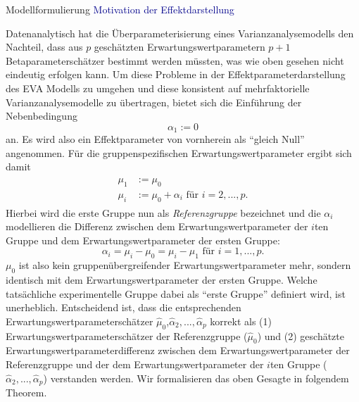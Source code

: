 \documentclass[
  8pt,
  ignorenonframetext,
]{beamer}
\begin{document}
\begin{frame}{Modellformulierung}
\protect\hypertarget{modellformulierung-2}{}
\textcolor{darkblue}{Motivation der Effektdarstellung}

\footnotesize

Datenanalytisch hat die Überparameterisierung eines
Varianzanalysemodells den Nachteil, dass aus \(p\) geschätzten
Erwartungswertparametern \(p + 1\) Betaparameterschätzer bestimmt werden
müssten, was wie oben gesehen nicht eindeutig erfolgen kann. Um diese
Probleme in der Effektparameterdarstellung des EVA Modells zu umgehen
und diese konsistent auf mehrfaktorielle Varianzanalysemodelle zu
übertragen, bietet sich die Einführung der Nebenbedingung
\begin{equation}
\alpha_1 := 0
\end{equation} an. Es wird also ein Effektparameter von vornherein als
``gleich Null'' angenommen. Für die gruppenspezifischen
Erwartungswertparameter ergibt sich damit \begin{align}
\begin{split}
\mu_1 & := \mu_0                                        \\
\mu_i & := \mu_0 + \alpha_i \mbox{ für } i= 2,...,p  .
\end{split}
\end{align} Hierbei wird die erste Gruppe nun als \emph{Referenzgruppe}
bezeichnet und die \(\alpha_i\) modellieren die Differenz zwischen dem
Erwartungswertparameter der \(i\)ten Gruppe und dem
Erwartungswertparameter der ersten Gruppe: \begin{equation}
\alpha_i = \mu_i - \mu_0 = \mu_i - \mu_1 \mbox{ für } i = 1,...,p.
\end{equation} \(\mu_0\) ist also kein gruppenübergreifender
Erwartungswertparameter mehr, sondern identisch mit dem
Erwartungswertparameter der ersten Gruppe. Welche tatsächliche
experimentelle Gruppe dabei als ``erste Gruppe'' definiert wird, ist
unerheblich. Entscheidend ist, dass die entsprechenden
Erwartungswertparameterschätzer
\(\hat{\mu}_0\),\(\hat{\alpha}_2, ..., \hat{\alpha}_p\) korrekt als (1)
Erwartungswertparameterschätzer der Referenzgruppe (\(\hat{\mu}_0\)) und
(2) geschätzte Erwartungswertparameterdifferenz zwischen dem
Erwartungswertparameter der Referenzgruppe und der dem
Erwartungswertparameter der \(i\)ten Gruppe
(\(\hat{\alpha}_2, ..., \hat{\alpha}_p\)) verstanden werden. Wir
formalisieren das oben Gesagte in folgendem Theorem.
\end{frame}
\end{document}
